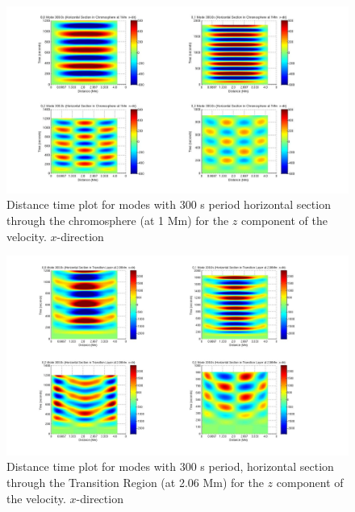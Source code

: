 \documentclass[authoryear,final,1p]{elsarticle}
\begin{document}
\begin{figure}[h]
\includegraphics[scale=0.3]{imagesn/dt_300_0_0_hor_x_1Mm.jpg}
\caption{Distance time plot for modes with 300 s period horizontal section through the chromosphere (at 1 Mm) for the $z$  component of the velocity. $x$-direction}
\end{figure}

\begin{figure}[h]
\includegraphics[scale=0.3]{imagesn/dt_300_hor_x_2p06Mm.jpg}
\caption{Distance time plot for modes with 300 s period, horizontal section through the Transition Region (at 2.06 Mm) 
for the $z$  component of the velocity. $x$-direction}
\end{figure}
\end{document}
